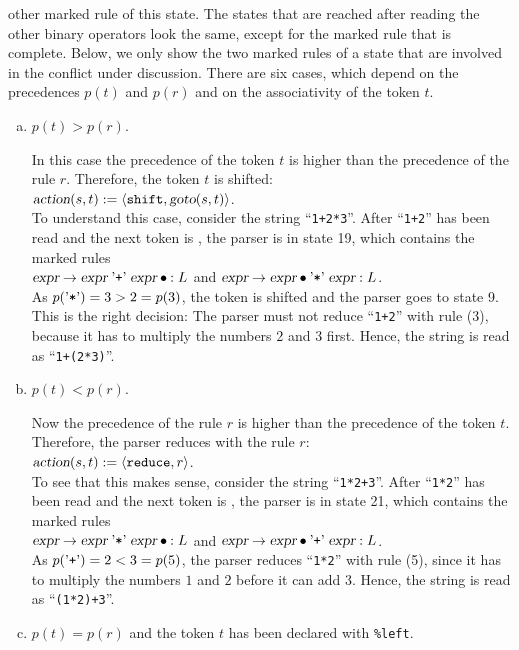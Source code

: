 other marked rule of this state.  The states that are reached after reading the other binary operators look the
same, except for the marked rule that is complete.  Below, we only show the two marked rules of a state that are
involved in the conflict under discussion.  There are six cases, which depend on the precedences $p(t)$ and $p(r)$
and on the associativity of the token $t$.
\begin{enumerate}[(a)]
\item $p(t) > p(r)$.

      In this case the precedence of the token $t$ is higher than the precedence of the rule $r$.
      Therefore, the token $t$ is shifted:
      \\[0.2cm]
      \hspace*{1.3cm}
      $\textsl{action}(s,t) := \langle \texttt{shift}, \textsl{goto}(s,t) \rangle$.
      \\[0.2cm]
      To understand this case, consider the string ``\texttt{1+2*3}''.  After ``\texttt{1+2}'' has been read and
      the next token is \saquoted{*}, the parser is in state 19, which contains the marked rules
      \\[0.2cm]
      \hspace*{1.3cm}
      $\textsl{expr} \rightarrow \textsl{expr} \aquoted{+} \textsl{expr} \mdot: L$ \quad and \quad
      $\textsl{expr} \rightarrow \textsl{expr} \mdot \saquoted{*}\; \textsl{expr}: L$.
      \\[0.2cm]
      As $p(\mbox{'\texttt{*}'}) = 3 > 2 = p(3)$, the token \saquoted{*} is shifted and the parser goes to state 9.  This
      is the right decision:  The parser must not reduce ``\texttt{1+2}'' with rule (3), because it has to
      multiply the numbers $2$ and $3$ first.  Hence, the string is read as ``\texttt{1+(2*3)}''.
\item $p(t) < p(r)$.

      Now the precedence of the rule $r$ is higher than the precedence of the token $t$.  Therefore, the parser
      reduces with the rule $r$:
      \\[0.2cm]
      \hspace*{1.3cm}
      $\textsl{action}(s,t) := \langle \texttt{reduce}, r \rangle$.
      \\[0.2cm]
      To see that this makes sense, consider the string ``\texttt{1*2+3}''.  After ``\texttt{1*2}'' has been read
      and the next token is \saquoted{+}, the parser is in state 21, which contains the marked rules
      \\[0.2cm]
      \hspace*{1.3cm}
      $\textsl{expr} \rightarrow \textsl{expr} \aquoted{*} \textsl{expr} \mdot: L$ \quad and \quad
      $\textsl{expr} \rightarrow \textsl{expr} \mdot \saquoted{+}\; \textsl{expr}: L$.
      \\[0.2cm]
      As $p(\mbox{'\texttt{+}'}) = 2 < 3 = p(5)$, the parser reduces ``\texttt{1*2}'' with rule (5), since it has to
      multiply the numbers $1$ and $2$ before it can add $3$.  Hence, the string is read as
      ``\texttt{(1*2)+3}''.
\item $p(t) = p(r)$ and the token $t$ has been declared with \texttt{\%left}.


\end{enumerate}
